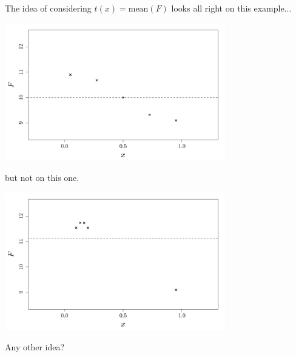 \documentclass{beamer}
\begin{document}
\begin{frame}{}
The idea of considering $t(x)=\text{mean}(F)$ looks all right on this example...
\begin{center}
	\includegraphics[height=6cm]{figures/R/trend_basicordinary}
\end{center}
\end{frame}

\begin{frame}{}
but not on this one.
\begin{center}
	\includegraphics[height=6cm]{figures/R/trend_pbbasicordinary}
\end{center}
Any other idea?
\end{frame}
\end{document}
